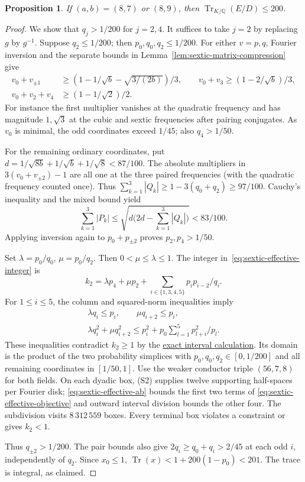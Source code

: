 \documentclass[11pt,reqno]{amsart}
\newcommand{\codecheck}[2]{\href{https://github.com/sebastienpalcoux/grothendieck-ring-classification/blob/d5750105bb5758f3ad38d2e5464dfcc12c019816/supplements/rank6/sphericality/#1}{#2}}
\newtheorem{proposition}[theorem]{Proposition}
\theoremstyle{remark}\newtheorem{remark}[theorem]{Remark}
\numberwithin{equation}{section}
\begin{document}
\begin{proposition}\label{thm:sextic-effective-height}
If $(a,b)=(8,7)$ or $(8,9)$, then
$\operatorname{Tr}_{K/\mathbb Q}(E/D)\le200$.
\end{proposition}
\begin{proof}
We show that $q_j>1/200$ for $j=2,4$. It suffices to take $j=2$
by replacing $g$ by $g^{-1}$. Suppose $q_2\le1/200$; then
$p_0,q_0,q_2\le1/200$. For either $v=p,q$, Fourier inversion
and the separate bounds in Lemma~\ref{lem:sextic-matrix-compression}
give
\begin{align*}
 v_0+v_{\pm1}&\ge(1-1/\sqrt b-\sqrt{3/(2b)})/3,\qquad
 v_0+v_3\ge(1-2/\sqrt b)/3,\\
 v_0+v_2+v_4&\ge(1-1/\sqrt2)/2.
\end{align*}
For instance the first multiplier vanishes at the quadratic
frequency and has magnitude $1,\sqrt3$ at the cubic and sextic
frequencies after pairing conjugates. As $v_0$ is minimal, the odd
coordinates exceed $1/45$; also $q_4>1/50$.

For the remaining ordinary coordinates, put
$d=1/\sqrt{8b}+1/\sqrt b+1/\sqrt8<87/100$.
The absolute multipliers in $3(v_0+v_{\pm2})-1$ are all one at
the three paired frequencies (with the quadratic frequency counted
once). Thus $\sum_{k=1}^3 |Q_k|\ge1-3(q_0+q_2)\ge97/100$.
Cauchy's inequality and the mixed bound yield
\[
 \sum_{k=1}^3|P_k|
 \le\sqrt{d\bigl(2d-\sum_{k=1}^3|Q_k|\bigr)}<83/100.
\]
Applying inversion again to $p_0+p_{\pm2}$ proves $p_2,p_4>1/50$.

Set $\lambda=p_0/q_0$, $\mu=p_0/q_2$. Then $0<\mu\le\lambda\le1$.
The integer in~\eqref{eq:sextic-effective-integer} is
\begin{equation}\label{eq:sextic-effective-objective}
 k_2=\lambda p_4+\mu p_2+
         \sum_{i\in\{1,3,4,5\}}p_i p_{i-2}/q_i .
\end{equation}
For $1\le i\le5$, the column and squared-norm inequalities imply
\begin{gather}
 \lambda q_i\le p_i,\qquad \mu q_{i+2}\le p_i,\nonumber\\
 \lambda q_i^2+\mu q_{i+2}^2
 \le p_i^2+p_0\sum_{l=1}^5 p_{l+i}^2/p_l .
 \label{eq:sextic-effective-ab}
\end{gather}
These inequalities contradict $k_2\ge1$ by the
\codecheck{sextic_height_bound.cpp}{exact interval calculation}.
Its domain is the product of the two probability simplices with
$p_0,q_0,q_2\in[0,1/200]$ and all remaining coordinates in
$[1/50,1]$. Use the weaker conductor triple $(56,7,8)$ for both
fields. On each dyadic box, (S2) supplies twelve supporting
half-spaces per Fourier disk; \eqref{eq:sextic-effective-ab}
bounds the first two terms of \eqref{eq:sextic-effective-objective}
and outward interval division bounds the other four. The subdivision visits $8\,312\,559$ boxes. Every terminal box
violates a constraint or gives $k_2<1$.

Thus $q_{\pm2}>1/200$. The pair bounds also give
$2q_i\ge q_0+q_i>2/45$ at each odd $i$, independently of $q_2$.
Since $x_0\le1$,
$\operatorname{Tr}(x)<1+200(1-p_0)<201$.
The trace is integral, as claimed.
\end{proof}
\end{document}
